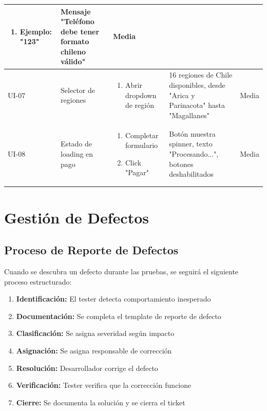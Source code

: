 \documentclass[12pt,a4paper]{article}
\begin{document}
\begin{longtable}{|p{1cm}|p{3cm}|p{4cm}|p{3cm}|p{3cm}|}
\begin{enumerate}[leftmargin=*,nosep]
    \item Ejemplo: "123"
\end{enumerate} &
Mensaje "Teléfono debe tener formato chileno válido" & Media \\
\hline
UI-07 & Selector de regiones &
\begin{enumerate}[leftmargin=*,nosep]
    \item Abrir dropdown de región
\end{enumerate} &
16 regiones de Chile disponibles, desde "Arica y Parinacota" hasta "Magallanes" & Media \\
\hline
UI-08 & Estado de loading en pago &
\begin{enumerate}[leftmargin=*,nosep]
    \item Completar formulario
    \item Click "Pagar"
\end{enumerate} &
Botón muestra spinner, texto "Procesando...", botones deshabilitados & Media \\
\hline
\end{longtable}

\section{Gestión de Defectos}

\subsection{Proceso de Reporte de Defectos}

Cuando se descubra un defecto durante las pruebas, se seguirá el siguiente proceso estructurado:

\begin{enumerate}
    \item \textbf{Identificación:} El tester detecta comportamiento inesperado
    \item \textbf{Documentación:} Se completa el template de reporte de defecto
    \item \textbf{Clasificación:} Se asigna severidad según impacto
    \item \textbf{Asignación:} Se asigna responsable de corrección
    \item \textbf{Resolución:} Desarrollador corrige el defecto
    \item \textbf{Verificación:} Tester verifica que la corrección funcione
    \item \textbf{Cierre:} Se documenta la solución y se cierra el ticket
\end{enumerate}
\end{document}
